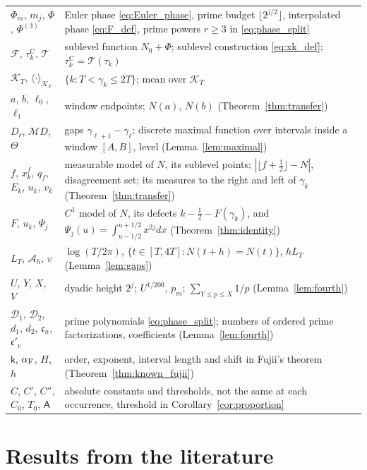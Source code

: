 \documentclass[11pt,a4paper]{article}
\makeatletter
\numberwithin{equation}{section}
\DeclareRobustCommand{\CGref}[1]{\ref{#1}}
\DeclareRobustCommand{\CGeqref}[1]{\eqref{#1}}
\let\CG@origref\ref
\let\CG@origeqref\eqref
\newcommand{\CG@gettip}[1]{\@ifundefined{CGTip@#1}{#1}{\csname CGTip@#1\endcsname}}
\DeclareRobustCommand{\CGref}[1]{\pdftooltip{\CG@origref{#1}}{\CG@gettip{#1}}}
\DeclareRobustCommand{\CGeqref}[1]{\pdftooltip{\CG@origeqref{#1}}{\CG@gettip{#1}}}
\theoremstyle{definition}
\theoremstyle{remark}
\newcommand{\Nz}{N_0} %
\newcommand{\Fc}{\mathcal F}
\newcommand{\Tc}{\mathcal T}
\newcommand{\Ph}{\Phi}
\newcommand{\M}{\mathcal M}
\newcommand{\Kc}{\mathcal K}
\makeatother
\begin{document}
\begin{center}
\begin{longtable}{p{}p{}}
$\Ph_m$, $m_j$, $\Ph$, $\Ph^{(3)}$ & Euler phase \CGeqref{eq:Euler_phase}, prime budget $\lfloor2^{j/2}\rfloor$, interpolated phase \CGeqref{eq:F_def}, prime powers $r\ge3$ in \CGeqref{eq:phase_split}\\
$\Fc$, $\tau_{k}^{\mathrm C}$, $\Tc$ & sublevel function $\Nz+\Ph$; sublevel construction \CGeqref{eq:xk_def}; $\tau_{k}^{\mathrm C}=\Tc(\tau_k)$\\
$\Kc_T$, $\langle\cdot\rangle_{\Kc_T}$ & $\{k:T<\gamma_k\le2T\}$; mean over $\Kc_T$\\
$a$, $b$, $\ell_0$, $\ell_1$ & window endpoints; $N(a)$, $N(b)$ (Theorem~\CGref{thm:transfer})\\
$D_\ell$, $\M D$, $\Theta$ & gaps $\gamma_{\ell+1}-\gamma_\ell$; discrete maximal function over intervals inside a window $[A,B]$, level (Lemma~\CGref{lem:maximal})\\
$f$, $x^f_k$, $q_f$, $E_k$, $u_k$, $v_k$ & measurable model of $N$, its sublevel points; $|\lfloor f+\frac12\rfloor-N|$, disagreement set; its measures to the right and left of $\gamma_k$ (Theorem~\CGref{thm:transfer})\\
$F$, $u_k$, $\Psi_j$ & $C^1$ model of $N$, its defects $k-\frac12-F(\gamma_k)$, and $\Psi_j(u)=\int_{u-1/2}^{u+1/2}x^{2j}dx$ (Theorem~\CGref{thm:identity})\\
$L_T$, $\mathcal A_h$, $v$ & $\log(T/2\pi)$, $\{t\in[T,4T]:N(t+h)=N(t)\}$, $hL_T$ (Lemma~\CGref{lem:gaps})\\
$U$, $Y$, $X$, $V$ & dyadic height $2^j$; $U^{1/200}$, $p_m$; $\sum_{Y\le p\le X}1/p$ (Lemma~\CGref{lem:fourth})\\
$\mathscr D_1$, $\mathscr D_2$, $d_1$, $d_2$, $\mathfrak c_n$, $\mathfrak c'_v$ & prime polynomials \CGeqref{eq:phase_split}; numbers of ordered prime factorizations, coefficients (Lemma~\CGref{lem:fourth})\\
$\mathsf k$, $\alpha_{\rm F}$, $H$, $h$ & order, exponent, interval length and shift in Fujii's theorem (Theorem~\CGref{thm:known_fujii})\\
$C$, $C'$, $C''$, $C_0$, $T_0$, $\mathsf A$ & absolute constants and thresholds, not the same at each occurrence, threshold in Corollary~\CGref{cor:proportion}\\
\end{longtable}
\end{center}

\section{Results from the literature}\label{sec:external}
\end{document}
